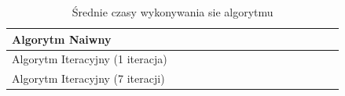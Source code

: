 \begin{table}[h!]
    \centering
    \begin{tabular}{|p{0.5\linewidth}|p{0.5\linewidth}|}
        \hline
        Algorytm Naiwny &  \\
        \hline
        Algorytm Iteracyjny (1 iteracja) & \\
        \hline
        Algorytm Iteracyjny (7 iteracji) & \\
        \hline
    \end{tabular}
    \caption{Średnie czasy wykonywania sie algorytmu}
    \label{tab:czasy1}
\end{table}



